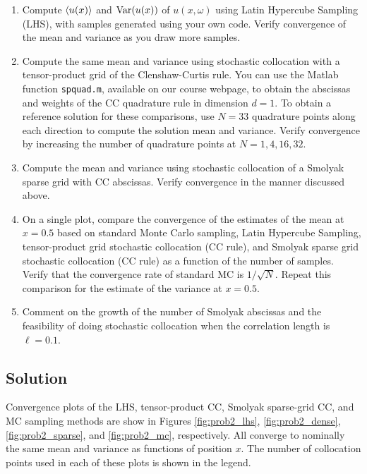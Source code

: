 \documentclass[11pt]{article}
\begin{document}
\begin{enumerate}

\item Compute $\left\langle u(x) \right\rangle$ and $\operatorname{Var}(u(x))$ of $u(x,\omega)$ using Latin Hypercube Sampling (LHS), with samples generated using your own code. Verify convergence of the mean and variance as you draw more samples.

\item Compute the same mean and variance using stochastic collocation with a tensor-product grid of the Clenshaw-Curtis rule. You can use the Matlab function \lstinline|spquad.m|, available on our course webpage, to obtain the abscissas and weights of the CC quadrature rule in dimension $d=1$. To obtain a reference solution for these comparisons, use $N=33$ quadrature points along each direction to compute the solution mean and variance. Verify convergence by increasing the number of quadrature points at $N = 1, 4, 16, 32$.

\item Compute the mean and variance using stochastic collocation of a Smolyak sparse grid with CC abscissas. Verify convergence in the manner discussed above.

\item On a single plot, compare the convergence of the estimates of the mean at $x=0.5$ based on standard Monte Carlo sampling, Latin Hypercube Sampling, tensor-product grid stochastic collocation (CC rule), and Smolyak sparse grid stochastic collocation (CC rule) as a function of the number of samples. Verify that the convergence rate of standard MC is $1/\sqrt{N}$. Repeat this comparison for the estimate of the variance at $x=0.5$.

\item Comment on the growth of the number of Smolyak abscissas and the feasibility of doing stochastic collocation when the correlation length is $\ell = 0.1$.

\end{enumerate}

\subsection*{Solution}

Convergence plots of the LHS, tensor-product CC, Smolyak sparse-grid CC, and MC sampling methods are show in Figures \ref{fig:prob2_lhs}, \ref{fig:prob2_dense}, \ref{fig:prob2_sparse}, and \ref{fig:prob2_mc}, respectively. All converge to nominally the same mean and variance as functions of position $x$. The number of collocation points used in each of these plots is shown in the legend.
\end{document}
